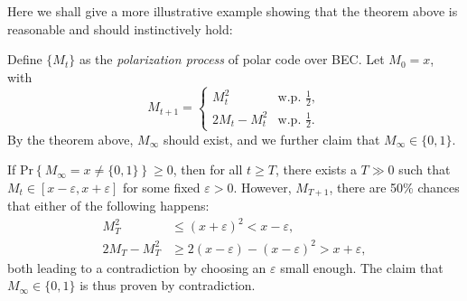 Here we shall give a more illustrative example showing that the theorem above is reasonable and should instinctively hold:
\begin{example}
    Define $\{M_t\}$ as the \textit{polarization process} of polar code over BEC. Let $M_0 = x$, with
    \begin{equation}
        M_{t+1} = \begin{cases}
            M_t^2 &\text{w.p. }\frac{1}{2},\\
            2M_t-M_t^2 &\text{w.p. }\frac{1}{2}.
        \end{cases}
    \end{equation}
    By the theorem above, $M_\infty$ should exist, and we further claim that $M_\infty\in\{0,1\}$.

    If $\mathrm{Pr}\left\{M_\infty=x\neq\{0,1\}\right\}\ge0$, then for all $t\ge T$, there exists a $T\gg0$ such that $M_t\in[x-\varepsilon,x+\varepsilon]$ for some fixed $\varepsilon>0$. However, $M_{T+1}$, there are 50\% chances that either of the following happens:
    \begin{align*}
        M_T^2 &\le (x+\varepsilon)^2 < x-\varepsilon,\\
        2M_T-M_T^2 &\ge 2(x-\varepsilon)-(x-\varepsilon)^2 > x+\varepsilon,
    \end{align*}
    both leading to a contradiction by choosing an $\varepsilon$ small enough. The claim that $M_\infty\in\{0,1\}$ is thus proven by contradiction.
\end{example}

